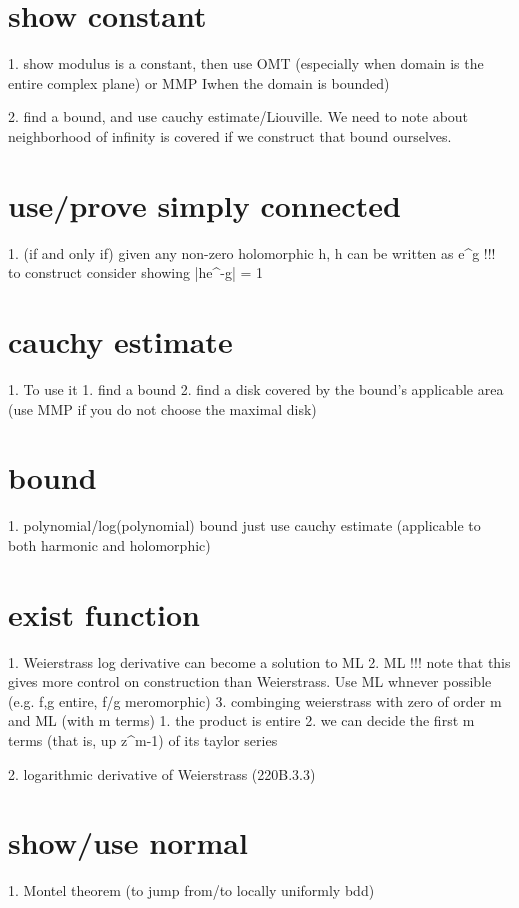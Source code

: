\section*{show constant}
1. show modulus is a constant, then use OMT (especially when domain is the entire complex plane) or MMP Iwhen the domain is bounded)

2. find a bound, and use cauchy estimate/Liouville. We need to note about neighborhood of infinity is covered if we construct that bound ourselves.

\section*{use/prove simply connected}
1. (if and only if) given any non-zero holomorphic h, h can be written as e^g
	!!! to construct consider showing |he^-g| = 1




\section*{cauchy estimate}
1. To use it
	1. find a bound
	2. find a disk covered by the bound's applicable area (use MMP if you do not choose the maximal disk)

\section*{bound}
1. polynomial/log(polynomial) bound
	just use cauchy estimate (applicable to both harmonic and holomorphic)


\section*{exist function}
1. Weierstrass
	log derivative can become a solution to ML
2. ML
 	!!! note that this gives more control on construction than Weierstrass. Use ML whnever possible (e.g. f,g entire, f/g meromorphic)
3. combinging weierstrass with zero of order m and ML (with m terms)
	1. the product is entire
	2. we can decide the first m terms (that is, up z^{m-1}) of its taylor series





2. logarithmic derivative of Weierstrass (220B.3.3)


\section*{show/use normal}
1. Montel theorem (to jump from/to locally uniformly bdd)


